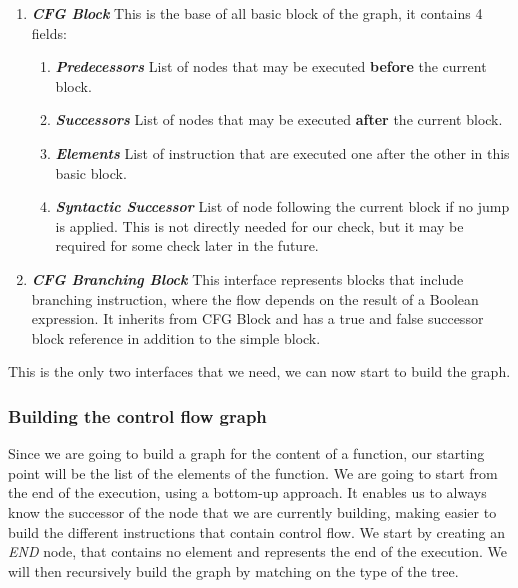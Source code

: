 \begin{enumerate}
	\item \textbf{\textit{CFG Block}} \newline 
	This is the base of all basic block of the graph, it contains 4 fields:
	\begin{enumerate}
		\item \textbf{\textit{Predecessors}} \newline
		List of nodes that may be executed \textbf{before} the current block.\newline
		\item \textbf{\textit{Successors}} \newline
		List of nodes that may be executed \textbf{after} the current block.\newline
		\item \textbf{\textit{Elements}} \newline
		List of instruction that are executed one after the other in this basic block. \newline
		\item \textbf{\textit{Syntactic Successor}} \newline
		List of node following the current block if no jump is applied. 
		This is not directly needed for our check, but it may be required for some check later in the future.\newline
	\end{enumerate}
	\item \textbf{\textit{CFG Branching Block}} \newline 
	This interface represents blocks that include branching instruction, where the flow depends on the result of a Boolean expression. 
	It inherits from CFG Block and has a true and false successor block reference in addition to the simple block.
	\newline 
\end{enumerate}
This is the only two interfaces that we need, we can now start to build the graph.

\subsubsection{Building the control flow graph}
\label{subsubsec:building_the_graph}
Since we are going to build a graph for the content of a function, our starting point will be the list of the elements of the function.
We are going to start from the end of the execution, using a bottom-up approach.
It enables us to always know the successor of the node that we are currently building, making easier to build the different instructions that contain control flow.
We start by creating an \emph{END} node, that contains no element and represents the end of the execution.
We will then recursively build the graph by matching on the type of the tree.


